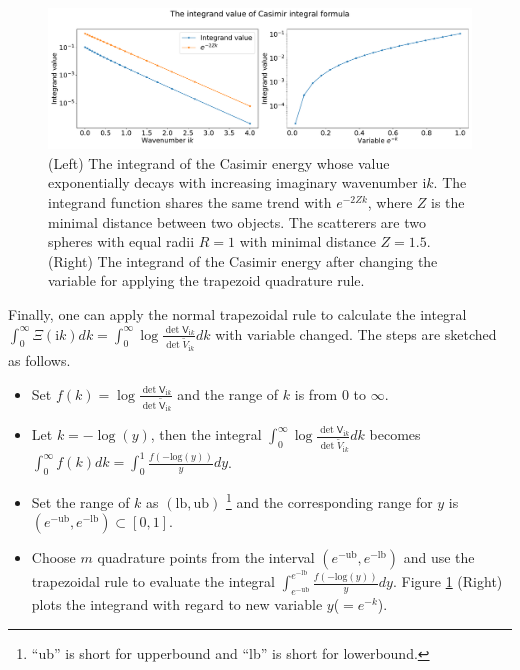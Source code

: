 \begin{figure}[H]
    \centering
    \hspace*{-1cm}\includegraphics[scale = 0.4]{figures/integ_exp_decay.pdf}
    \caption{(Left) The integrand of the Casimir energy whose value exponentially decays with increasing imaginary wavenumber $\mathrm{i}k$. The integrand function 
    shares the same trend with $e^{-2Zk}$, where $Z$ is the minimal distance between two objects. The scatterers are two spheres with equal radii 
    $R = 1$ with minimal distance $Z = 1.5$. (Right) The integrand of the Casimir energy after changing the 
    variable for applying the trapezoid quadrature rule.}
    \label{The integrand decays exponentially}
\end{figure}


Finally, one can apply the normal trapezoidal rule to calculate the integral 
$\int_{0}^{\infty}\Xi(\mathrm{i}k)dk = \int_{0}^{\infty}\log\frac{\det\mathsf{V}_{\mathrm{i}k}}{\det\tilde{V}_{\mathrm{i}k}}dk$ with variable changed. 
The steps are sketched as follows.

\begin{itemize}
    \item Set $f(k) = \log\frac{\det\mathsf{V}_{\mathrm{i}k}}{\det\tilde{\mathsf{V}}_{\mathrm{i}k}}$ and the range of $k$ is from 0 to $\infty$.
    \item Let $k = -\log(y)$, then the integral $\int_{0}^{\infty}\log\frac{\det\mathsf{V}_{\mathrm{i}k}}{\det\tilde{V}_{\mathrm{i}k}}dk$ becomes 
    $\int_{0}^{\infty}f(k)dk = \int_{0}^{1}\frac{f(-\text{log}(y))}{y}dy$.
    \item Set the range of $k$ as $(\text{lb}, \text{ub})$ \footnote{``ub'' is short for upperbound and ``lb'' is short for lowerbound.} and the corresponding 
    range for $y$ is $(e^{-\text{ub}}, e^{-\text{lb}})\subset[0,1]$.
    \item Choose $m$ quadrature points from the interval $(e^{-\text{ub}}, e^{-\text{lb}})$ and use the trapezoidal rule to evaluate the integral 
    $\int_{e^{-\text{ub}}}^{e^{-\text{lb}}}\frac{f(-\text{log}(y))}{y}dy$. Figure \ref{The integrand decays exponentially} (Right) plots the integrand with regard to new 
    variable $y$($= e^{-k}$).

\end{itemize}



 

